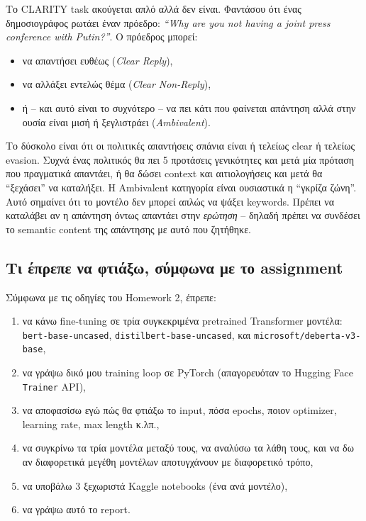 \documentclass[12pt]{fphw}
\begin{document}
Το CLARITY task ακούγεται απλό αλλά δεν είναι. Φαντάσου ότι ένας δημοσιογράφος ρωτάει έναν πρόεδρο: \emph{``Why are you not having a joint press conference with Putin?''}. Ο πρόεδρος μπορεί:

\begin{itemize}
    \item να απαντήσει ευθέως (\emph{Clear Reply}),
    \item να αλλάξει εντελώς θέμα (\emph{Clear Non-Reply}),
    \item ή -- και αυτό είναι το συχνότερο -- να πει κάτι που φαίνεται απάντηση αλλά στην ουσία είναι μισή ή ξεγλιστράει (\emph{Ambivalent}).
\end{itemize}

Το δύσκολο είναι ότι οι πολιτικές απαντήσεις σπάνια είναι ή τελείως clear ή τελείως evasion. Συχνά ένας πολιτικός θα πει 5 προτάσεις γενικότητες και μετά μία πρόταση που πραγματικά απαντάει, ή θα δώσει context και αιτιολογήσεις και μετά θα ``ξεχάσει'' να καταλήξει. Η Ambivalent κατηγορία είναι ουσιαστικά η ``γκρίζα ζώνη''. Αυτό σημαίνει ότι το μοντέλο δεν μπορεί απλώς να ψάξει keywords. Πρέπει να καταλάβει αν η απάντηση όντως απαντάει στην \textit{ερώτηση} -- δηλαδή πρέπει να συνδέσει το semantic content της απάντησης με αυτό που ζητήθηκε.

\subsection{Τι έπρεπε να φτιάξω, σύμφωνα με το assignment}

Σύμφωνα με τις οδηγίες του Homework 2, έπρεπε:

\begin{enumerate}
    \item να κάνω fine-tuning σε τρία συγκεκριμένα pretrained Transformer μοντέλα: \texttt{bert-base-uncased}, \texttt{distilbert-base-uncased}, και \texttt{microsoft/deberta-v3-base},
    \item να γράψω δικό μου training loop σε PyTorch (απαγορευόταν το Hugging Face \texttt{Trainer} API),
    \item να αποφασίσω εγώ πώς θα φτιάξω το input, πόσα epochs, ποιον optimizer, learning rate, max length κ.λπ.,
    \item να συγκρίνω τα τρία μοντέλα μεταξύ τους, να αναλύσω τα λάθη τους, και να δω αν διαφορετικά μεγέθη μοντέλων αποτυγχάνουν με διαφορετικό τρόπο,
    \item να υποβάλω 3 ξεχωριστά Kaggle notebooks (ένα ανά μοντέλο),
    \item να γράψω αυτό το report.
\end{enumerate}
\end{document}
